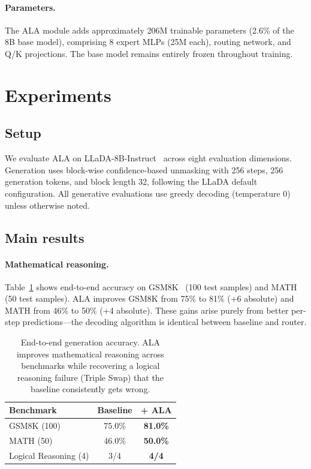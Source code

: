 \documentclass{article} %
\begin{document}
\paragraph{Parameters.}
The ALA module adds approximately 206M trainable parameters (2.6\% of the 8B base model), comprising 8 expert MLPs (25M each), routing network, and Q/K projections.
The base model remains entirely frozen throughout training.


\section{Experiments}
\label{sec:experiments}

\subsection{Setup}

We evaluate ALA on LLaDA-8B-Instruct~\citep{nie2025llada} across eight evaluation dimensions.
Generation uses block-wise confidence-based unmasking with 256 steps, 256 generation tokens, and block length 32, following the LLaDA default configuration.
All generative evaluations use greedy decoding (temperature 0) unless otherwise noted.

\subsection{Main results}

\paragraph{Mathematical reasoning.}
Table~\ref{tab:main} shows end-to-end accuracy on GSM8K~\citep{cobbe2021gsm8k} (100 test samples) and MATH~\citep{hendrycks2021math} (50 test samples).
ALA improves GSM8K from 75\% to 81\% (+6 absolute) and MATH from 46\% to 50\% (+4 absolute).
These gains arise purely from better per-step predictions---the decoding algorithm is identical between baseline and router.

\begin{table}[t]
\begin{center}
\begin{tabular}{lcc}
\toprule
\textbf{Benchmark} & \textbf{Baseline} & \textbf{+ ALA} \\
\midrule
GSM8K (100) & 75.0\% & \textbf{81.0\%} \\
MATH (50) & 46.0\% & \textbf{50.0\%} \\
Logical Reasoning (4) & 3/4 & \textbf{4/4} \\
\bottomrule
\end{tabular}
\end{center}
\caption{End-to-end generation accuracy. ALA improves mathematical reasoning across benchmarks while recovering a logical reasoning failure (Triple Swap) that the baseline consistently gets wrong.}\label{tab:main}
\end{table}
\end{document}
